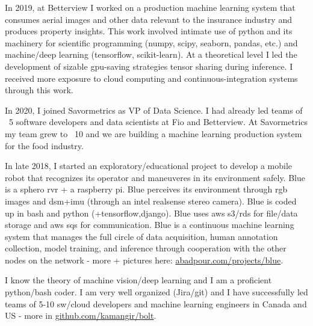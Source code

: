 \osspacing
In 2019, at Betterview I worked on a production machine learning system that consumes aerial images and other data relevant to the insurance industry and produces property insights. This work involved intimate use of python and its machinery for scientific programming (numpy, scipy, seaborn, pandas, etc.) and machine/deep learning (tensorflow, scikit-learn). At a theoretical level I led the development of sizable gpu-saving strategies tensor sharing during inference. I received more exposure to cloud computing and continuous-integration systems through this work.

\osspacing
In 2020, I joined Savormetrics as VP of Data Science. I had already led teams of ~5 software developers and data scientists at Fio and Betterview. At Savormetrics my team grew to ~10 and we are building a machine learning production system for the food industry.

\osspacing
In late 2018, I started an exploratory/educational project to develop a mobile robot that recognizes its operator and maneuveres in its environment safely. Blue is a sphero rvr + a raspberry pi. Blue perceives its environment through rgb images and dsm+imu (through an intel realsense stereo camera). Blue is coded up in bash and python (+tensorflow,django). Blue uses aws s3/rds for file/data storage and aws sqs for communication. Blue is a continuous machine learning system that manages the full circle of data acquisition, human annotation collection, model training, and inference through cooperation with the other nodes on the network - more + pictures here: \href{http://abadpour.com/projects/blue}{abadpour.com/projects/blue}.

\osspacing
I know the theory of machine vision/deep learning and I am a proficient python/bash coder. I am very well organized (Jira/git) and I have successfully led teams of 5-10 sw/cloud developers and machine learning engineers in Canada and US - more in \href{https://github.com/kamangir/bolt}{github.com/kamangir/bolt}.

